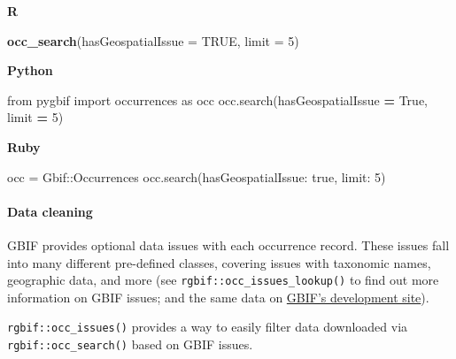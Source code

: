 \documentclass[author-year, review, 11pt]{components/elsarticle} %
\newenvironment{Shaded}{\begin{snugshade}}{\end{snugshade}}
\newcommand{\KeywordTok}[1]{\textcolor[rgb]{0.13,0.29,0.53}{\textbf{#1}}}
\newcommand{\DataTypeTok}[1]{\textcolor[rgb]{0.13,0.29,0.53}{#1}}
\newcommand{\DecValTok}[1]{\textcolor[rgb]{0.00,0.00,0.81}{#1}}
\newcommand{\StringTok}[1]{\textcolor[rgb]{0.31,0.60,0.02}{#1}}
\newcommand{\ImportTok}[1]{#1}
\newcommand{\CommentTok}[1]{\textcolor[rgb]{0.56,0.35,0.01}{\textit{#1}}}
\newcommand{\OtherTok}[1]{\textcolor[rgb]{0.56,0.35,0.01}{#1}}
\newcommand{\VariableTok}[1]{\textcolor[rgb]{0.00,0.00,0.00}{#1}}
\newcommand{\OperatorTok}[1]{\textcolor[rgb]{0.81,0.36,0.00}{\textbf{#1}}}
\newcommand{\NormalTok}[1]{#1}
\begin{document}
\textbf{R}

\begin{Shaded}
\begin{Highlighting}[]
\KeywordTok{occ_search}\NormalTok{(}\DataTypeTok{hasGeospatialIssue =} \OtherTok{TRUE}\NormalTok{, }\DataTypeTok{limit =} \DecValTok{5}\NormalTok{)}
\end{Highlighting}
\end{Shaded}

\textbf{Python}

\begin{Shaded}
\begin{Highlighting}[]
\ImportTok{from}\NormalTok{ pygbif }\ImportTok{import}\NormalTok{ occurrences }\ImportTok{as}\NormalTok{ occ}
\NormalTok{occ.search(hasGeospatialIssue }\OperatorTok{=} \VariableTok{True}\NormalTok{, limit }\OperatorTok{=} \DecValTok{5}\NormalTok{)}
\end{Highlighting}
\end{Shaded}

\textbf{Ruby}

\begin{Shaded}
\begin{Highlighting}[]
\NormalTok{occ = }\DataTypeTok{Gbif}\NormalTok{::}\DataTypeTok{Occurrences}
\NormalTok{occ.search(}\StringTok{hasGeospatialIssue: }\DecValTok{true}\NormalTok{, }\StringTok{limit: }\DecValTok{5}\NormalTok{)}
\end{Highlighting}
\end{Shaded}

\paragraph{Data cleaning}\label{data-cleaning}

GBIF provides optional data issues with each occurrence record. These
issues fall into many different pre-defined classes, covering issues
with taxonomic names, geographic data, and more (see
\texttt{rgbif::occ\_issues\_lookup()} to find out more information on
GBIF issues; and the same data on
\href{http://gbif.github.io/gbif-api/apidocs/org/gbif/api/vocabulary/OccurrenceIssue.html}{GBIF's
development site}).

\texttt{rgbif::occ\_issues()} provides a way to easily filter data
downloaded via \texttt{rgbif::occ\_search()} based on GBIF issues.

\begin{Shaded}
\end{Shaded}
\end{document}
